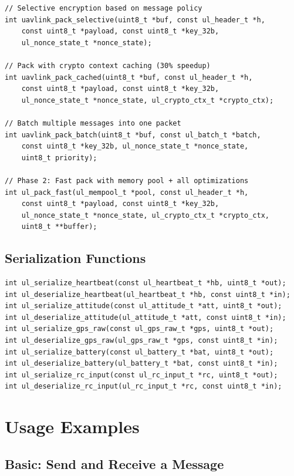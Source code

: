 \documentclass[11pt,a4paper]{article}
\begin{document}
\begin{lstlisting}
// Selective encryption based on message policy
int uavlink_pack_selective(uint8_t *buf, const ul_header_t *h,
    const uint8_t *payload, const uint8_t *key_32b,
    ul_nonce_state_t *nonce_state);

// Pack with crypto context caching (30% speedup)
int uavlink_pack_cached(uint8_t *buf, const ul_header_t *h,
    const uint8_t *payload, const uint8_t *key_32b,
    ul_nonce_state_t *nonce_state, ul_crypto_ctx_t *crypto_ctx);

// Batch multiple messages into one packet
int uavlink_pack_batch(uint8_t *buf, const ul_batch_t *batch,
    const uint8_t *key_32b, ul_nonce_state_t *nonce_state,
    uint8_t priority);

// Phase 2: Fast pack with memory pool + all optimizations
int ul_pack_fast(ul_mempool_t *pool, const ul_header_t *h,
    const uint8_t *payload, const uint8_t *key_32b,
    ul_nonce_state_t *nonce_state, ul_crypto_ctx_t *crypto_ctx,
    uint8_t **buffer);
\end{lstlisting}

\subsection{Serialization Functions}

\begin{lstlisting}
int ul_serialize_heartbeat(const ul_heartbeat_t *hb, uint8_t *out);
int ul_deserialize_heartbeat(ul_heartbeat_t *hb, const uint8_t *in);
int ul_serialize_attitude(const ul_attitude_t *att, uint8_t *out);
int ul_deserialize_attitude(ul_attitude_t *att, const uint8_t *in);
int ul_serialize_gps_raw(const ul_gps_raw_t *gps, uint8_t *out);
int ul_deserialize_gps_raw(ul_gps_raw_t *gps, const uint8_t *in);
int ul_serialize_battery(const ul_battery_t *bat, uint8_t *out);
int ul_deserialize_battery(ul_battery_t *bat, const uint8_t *in);
int ul_serialize_rc_input(const ul_rc_input_t *rc, uint8_t *out);
int ul_deserialize_rc_input(ul_rc_input_t *rc, const uint8_t *in);
\end{lstlisting}

\newpage
\section{Usage Examples}

\subsection{Basic: Send and Receive a Message}
\end{document}
